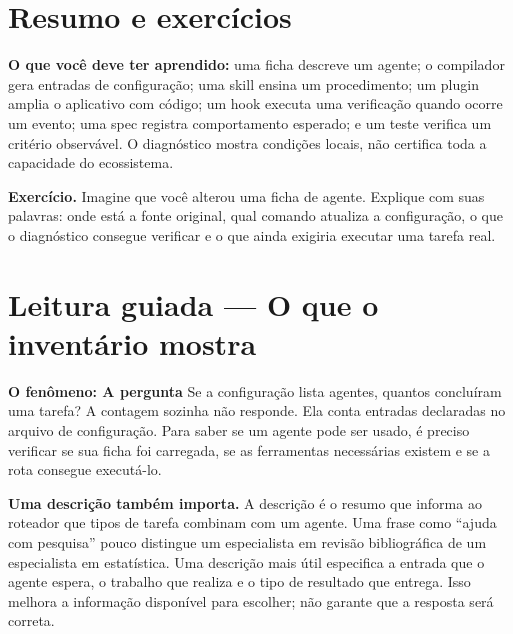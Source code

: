 \section{Resumo e exercícios}

\begin{resultado}
\textbf{O que você deve ter aprendido:} uma ficha descreve um agente; o
compilador gera entradas de configuração; uma skill ensina um procedimento; um
plugin amplia o aplicativo com código; um hook executa uma verificação quando
ocorre um evento; uma spec registra comportamento esperado; e um teste verifica
um critério observável. O diagnóstico mostra condições locais, não certifica
toda a capacidade do ecossistema.

\textbf{Exercício.} Imagine que você alterou uma ficha de agente. Explique com
suas palavras: onde está a fonte original, qual comando atualiza a configuração,
o que o diagnóstico consegue verificar e o que ainda exigiria executar uma
tarefa real.
\end{resultado}



\section[Leitura guiada]{Leitura guiada — O que o inventário mostra}


\begin{descricao}
\textbf{O fenômeno: A pergunta} Se a configuração lista \CoreAgentCount{}
agentes, quantos concluíram uma tarefa? A contagem sozinha não responde. Ela conta
entradas declaradas no arquivo de configuração. Para saber se um agente pode
ser usado, é preciso verificar se sua ficha foi carregada, se as ferramentas
necessárias existem e se a rota consegue executá-lo.

\textbf{Uma descrição também importa.} A descrição é o resumo que informa ao
roteador que tipos de tarefa combinam com um agente. Uma frase como ``ajuda com
pesquisa'' pouco distingue um especialista em revisão bibliográfica de um
especialista em estatística. Uma descrição mais útil especifica a entrada que o
agente espera, o trabalho que realiza e o tipo de resultado que entrega. Isso
melhora a informação disponível para escolher; não garante que a resposta será
correta.
\end{descricao}

